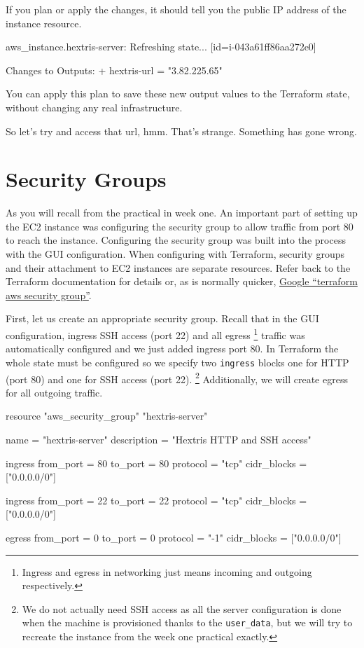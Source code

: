 \documentclass{csse4400}
\begin{document}
If you plan or apply the changes, it should tell you the public IP address of the instance resource.

\begin{code}[language=terraform-plan]{}
aws_instance.hextris-server: Refreshing state... [id=i-043a61ff86aa272e0]

Changes to Outputs:
  + hextris-url = "3.82.225.65"
\end{code}

You can apply this plan to save these new output values to the Terraform state, without changing any real infrastructure.  

So let's try and access that url, hmm.
That's strange. Something has gone wrong.

\section{Security Groups}
As you will recall from the practical in week one.
An important part of setting up the EC2 instance was configuring the security group to allow traffic from port 80 to reach the instance.
Configuring the security group was built into the process with the GUI configuration.
When configuring with Terraform, security groups and their attachment to EC2 instances are separate resources.
Refer back to the Terraform documentation for details or,
as is normally quicker, \href{https://www.google.com/search?q=terraform+aws+security+group}{Google ``terraform aws security group''}.

First, let us create an appropriate security group.
Recall that in the GUI configuration,
ingress SSH access (port 22) and all egress%
\footnote{Ingress and egress in networking just means incoming and outgoing respectively.}
traffic was automatically configured and we just added ingress port 80.
In Terraform the whole state must be configured so we specify two
\texttt{ingress} blocks one for HTTP (port 80) and one for SSH access (port 22).%
\footnote{We do not actually need SSH access as all the server configuration is done when the machine is provisioned thanks to the \texttt{user\_data},
but we will try to recreate the instance from the week one practical exactly.}
Additionally, we will create egress for all outgoing traffic.

\begin{code}[language=terraform]{}
resource "aws_security_group" "hextris-server" {
  name = "hextris-server"
  description = "Hextris HTTP and SSH access"

  ingress {
    from_port = 80
    to_port = 80
    protocol = "tcp"
    cidr_blocks = ["0.0.0.0/0"]
  }

  ingress {
    from_port = 22
    to_port = 22
    protocol = "tcp"
    cidr_blocks = ["0.0.0.0/0"]
  }

  egress {
    from_port = 0
    to_port = 0
    protocol = "-1"
    cidr_blocks = ["0.0.0.0/0"]
  }
}
\end{code}
\end{document}
